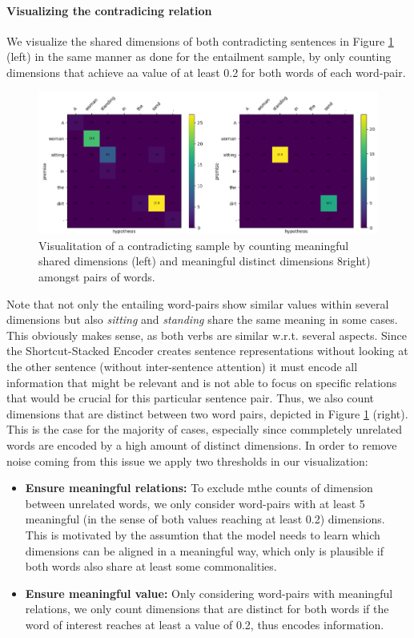 \paragraph*{Visualizing the contradicing relation}
We visualize the shared dimensions of both contradicting sentences in Figure \ref{fig:alignment_contr_sample_general} (left) in the same manner as done for the entailment sample, by only counting dimensions that achieve aa value of at least 0.2 for both words of each word-pair. 
\begin{figure}[tph!]
\centering
	\includegraphics[totalheight=7cm]{fig/alignment_contr_sample_general.png}
	\caption{Visualitation of a contradicting sample by counting meaningful shared dimensions (left) and meaningful distinct dimensions 8right) amongst pairs of words.}
	\label{fig:alignment_contr_sample_general}
\end{figure}
Note that not only the entailing word-pairs show similar values within several dimensions but also \textit{sitting} and \textit{standing} share the same meaning in some cases. This obviously makes sense, as both verbs are similar w.r.t. several aspects. Since the Shortcut-Stacked Encoder creates sentence representations without looking at the other sentence (without inter-sentence attention) it must encode all information that might be relevant and is not able to focus on specific relations that would be crucial for this particular sentence pair. Thus, we also count dimensions that are distinct between two word pairs, depicted in Figure \ref{fig:alignment_contr_sample_general} (right). This is the case for the majority of cases, especially since commpletely unrelated words are encoded by a high amount of distinct dimensions. In order to remove noise coming from this issue we apply two thresholds in our visualization:
\begin{itemize}
\item \textbf{Ensure meaningful relations:} To exclude mthe counts of dimension between unrelated words, we only consider word-pairs with at least 5 meaningful (in the sense of both values reaching at least 0.2) dimensions. This is motivated by the assumtion that the model needs to learn which dimensions can be aligned in a meaningful way, which only is plausible if both words also share at least some commonalities. 
\item \textbf{Ensure meaningful value:} Only considering word-pairs with meaningful relations, we only count dimensions that are distinct for both words if the word of interest reaches at least a value of 0.2, thus encodes information.
\end{itemize}
